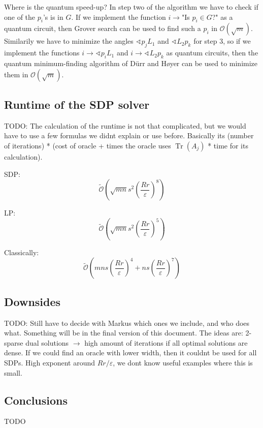 \documentclass[11pt,a4paper]{scrartcl}
\DeclareMathOperator{\Tr}{Tr}
\begin{document}
Where is the quantum speed-up? In step two of the algorithm we have to check if one of the $p_i$'s is in $G$. If we implement the function $i\to$"Is $p_i\in G$?" as a  quantum circuit, then Grover search can be used to find such a $p_i$ in $\mathcal{O}(\sqrt{m})$. Similarily we have to minimize the angles $\sphericalangle p_j L_1$ and $\sphericalangle L_2 p_k$ for step 3, so if we implement the functions $i\to\sphericalangle p_i L_1$ and $i\to \sphericalangle L_2 p_k$ as quantum circuits, then the quantum minimum-finding algorithm of Dürr and Høyer can be used to minimize them in $\mathcal{O}(\sqrt{m})$.


\subsection{Runtime of the SDP solver}

TODO: The calculation of the runtime is not that complicated, but we would have to use a few formulas we didnt explain or use before. Basically its (number of iterations) * (cost of oracle + times the oracle uses $\Tr(A_j)$ * time for its calculation). 

SDP:
\begin{equation*}
\tilde{\mathcal{O}}\left(\sqrt{mn}s^2\left(\frac{Rr}{\varepsilon}\right)^8\right)
\end{equation*}

LP:
\begin{equation*}
\tilde{\mathcal{O}}\left(\sqrt{mn}s^2\left(\frac{Rr}{\varepsilon}\right)^5\right)
\end{equation*}

Classically:
\begin{equation*}
\tilde{\mathcal{O}}\left(mns\left(\frac{Rr}{\varepsilon}\right)^4+ns\left(\frac{Rr}{\varepsilon}\right)^7\right)
\end{equation*}

\subsection{Downsides}
TODO: Still have to decide with Markus which ones we include, and who does what. Something will be in the final version of this document. The ideas are: 2-sparse dual solutions $\rightarrow$ high amount of iterations if all optimal solutions are dense. If we could find an oracle with lower width, then it couldnt be used for all SDPs. High exponent around $Rr/\varepsilon$, we dont know useful examples where this is small.

\subsection{Conclusions}
TODO


\nocite{*}

\printbibliography
\end{document}
